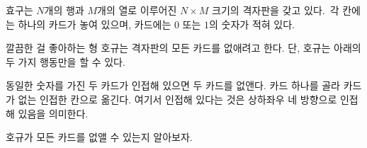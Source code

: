 효구는 $N$개의 행과 $M$개의 열로 이루어진 $N \times M$ 크기의 격자판을 갖고 있다. 각 칸에는 하나의 카드가 놓여 있으며, 카드에는 $0$ 또는 $1$의 숫자가 적혀 있다.

깔끔한 걸 좋아하는 형 호규는 격자판의 모든 카드를 없애려고 한다. 단, 호규는 아래의 두 가지 행동만을 할 수 있다.

동일한 숫자를 가진 두 카드가 인접해 있으면 두 카드를 없앤다.
카드 하나를 골라 카드가 없는 인접한 칸으로 옮긴다.
여기서 인접해 있다는 것은 상하좌우 네 방향으로 인접해 있음을 의미한다.

호규가 모든 카드를 없앨 수 있는지 알아보자.
